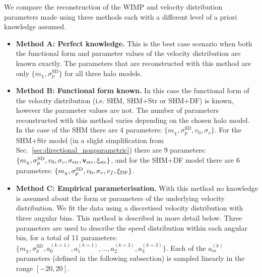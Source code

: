 We compare the reconstruction of the WIMP and velocity distribution parameters made using three methods each with a different level of a priori knowledge assumed.
\begin{itemize}
\item{{\bf Method A: Perfect knowledge.} This is the best case scenario when both the functional form and parameter values of the velocity distribution are known exactly. The parameters that are reconstructed with this method are only $\{m_\chi,\sigma_p^{\textrm{SD}}\}$ for all three halo models.}

\item{{\bf Method B: Functional form known.} In this case the functional form of the velocity distribution (i.e. SHM, SHM+Str or SHM+DF) is known, however the parameter values are not. The number of parameters reconstructed with this method varies depending on the chosen halo model. In the case of the SHM there are 4 parameters: $\{m_\chi,\sigma_p^{\textrm{SD}},v_0,\sigma_v\}$. For the SHM+Str model (in a slight simplification from Sec.~\ref{sec:directional_nonparametric}) there are 9 parameters: $\{m_\chi,\sigma_p^{\textrm{SD}},v_0,\sigma_v,\sigma_{\rm str},\mathbf{v}_{\rm str},\xi_{\rm str}\}$, and for the SHM+DF model there are 6 parameters: $\{m_\chi,\sigma_p^{\textrm{SD}},v_0,\sigma_v,v_f,\xi_{\rm DF}\}$.}

\item{{\bf Method C: Empirical parameterisation.} With this method no knowledge is assumed about the form or parameters of the underlying velocity distribution. We fit the data using a discretised velocity distribution with three angular bins. This method is described in more detail below. Three parameters are used to describe the speed distribution within each angular bin, for a total of 11 parameters: $\{ m_\chi, \sigma_p^{\textrm{SD}}, a_0^{(k=1)}, a_1^{(k=1)}, \ldots, a_2^{(k=3)}, a_3^{(k=3)} \}$.} Each of the $a_m^{(k)}$ parameters (defined in the following subsection) is sampled linearly in the range $[-20, 20]$.
\end{itemize}


